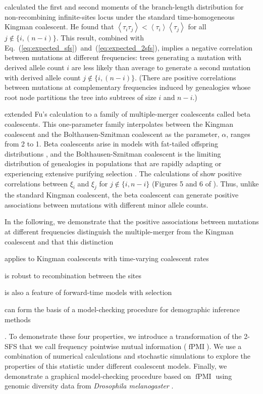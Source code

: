 \documentclass[11pt, letterpaper]{article}   	%
\newcommand{\eqs}[2]{Eq.~(\ref{#1})~and~(\ref{#2})}
\newcommand{\E}[1]{\left< #1 \right>}
\DeclareMathOperator{\fpmi}{fPMI}
\begin{document}
\textcite{Fu1995} calculated the first and second moments of the branch-length distribution for non-recombining infinite-sites locus under the standard time-homogeneous Kingman coalescent.
He found that $\E{\tau_i \tau_j} < \E{\tau_i}\E{\tau_j}$ for all $j \not\in \{i, (n-i)\}$.
This result, combined with \eqs{eq:expected_sfs}{eq:expected_2sfs}, implies a negative correlation between mutations at different frequencies: trees generating a mutation with derived allele count $i$ are less likely than average to generate a second mutation with derived allele count $j \not\in \{i, (n-i)\}$.
(There are positive correlations between mutations at complementary frequencies induced by genealogies whose root node partitions the tree into subtrees of size $i$ and $n-i$.)

\textcite{BirknerEtAl2013} extended Fu's calculation to a family of multiple-merger coalescents called beta coalescents.
This one-parameter family interpolates between the Kingman coalescent and the Bolthausen-Sznitman coalescent as the parameter, $\alpha$, ranges from 2 to 1.
Beta coalescents arise in models with fat-tailed offspring distributions \autocite{Schweinsberg2003, SteinruckenEtAl2013}, and the Bolthausen-Sznitman coalescent is the limiting distribution of genealogies in populations that are rapidly adapting or experiencing extensive purifying selection \autocite{NeherHallatschek2013}.
The calculations of \textcite{BirknerEtAl2013} show positive correlations between $\xi_i$ and $\xi_j$ for $j \not\in \{i, n-i\}$ (Figures 5 and 6 of \cite{BirknerEtAl2013}).
Thus, unlike the standard Kingman coalescent, the beta coalescent can generate positive associations between mutations with different minor allele counts.

In the following, we demonstrate that the positive associations between mutations at different frequencies distinguish the multiple-merger from the Kingman coalescent and that this distinction
\begin{enumerate*}[label=(\roman*), before=\unskip{: }, itemjoin={{; }}, itemjoin*={{, and }}]
    \item applies to Kingman coalescents with time-varying coalescent rates
    \item is robust to recombination between the sites
    \item is also a feature of forward-time models with selection
    \item can form the basis of a model-checking procedure for demographic inference methods
\end{enumerate*}.
To demonstrate these four properties, we introduce a transformation of the 2-SFS that we call frequency pointwise mutual information ($\fpmi$).
We use a combination of numerical calculations and stochastic simulations to explore the properties of this statistic under different coalescent models.
Finally, we demonstrate a graphical model-checking procedure based on $\fpmi$ using genomic diversity data from \textit{Drosophila melanogaster} \autocite{LackEtAl2015}.
\end{document}
